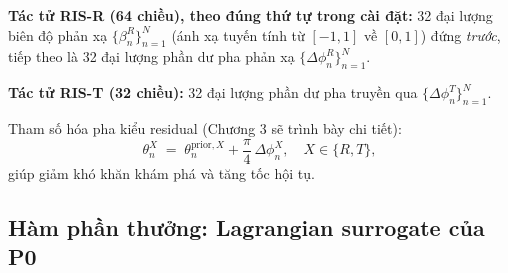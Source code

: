 \textbf{Tác tử RIS-R (64 chiều), theo đúng thứ tự trong cài đặt:} 32 đại
lượng biên độ phản xạ $\{\beta_n^R\}_{n=1}^{N}$ (ánh xạ tuyến tính từ
$[-1,1]$ về $[0,1]$) đứng \emph{trước}, tiếp theo là 32 đại lượng phần dư
pha phản xạ $\{\Delta\phi_n^R\}_{n=1}^{N}$.

\textbf{Tác tử RIS-T (32 chiều):} 32 đại lượng phần dư pha truyền qua
$\{\Delta\phi_n^T\}_{n=1}^{N}$.

Tham số hóa pha kiểu residual (Chương 3 sẽ trình bày chi tiết):
\begin{equation}
\theta_n^X \;=\; \theta_n^{\text{prior},X} + \frac{\pi}{4}\,\Delta\phi_n^X,
\quad X \in \{R, T\},
\label{eq:residual_phase}
\end{equation}
giúp giảm khó khăn khám phá và tăng tốc hội tụ.

\subsection{Hàm phần thưởng: Lagrangian surrogate của P0}
\label{sec:reward_surrogate}


